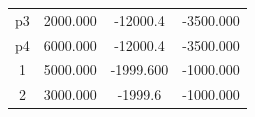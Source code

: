 \begin{table}[h]
\begin{tabular}{cccc}
\multicolumn{1}{c|}{p3} &
\multicolumn{1}{c|}{2000.000} &
\multicolumn{1}{c|}{-12000.4} &
\multicolumn{1}{c}{-3500.000} \\

\multicolumn{1}{c|}{p4} &
\multicolumn{1}{c|}{6000.000} &
\multicolumn{1}{c|}{-12000.4} &
\multicolumn{1}{c}{-3500.000} \\

\multicolumn{1}{c|}{1} &
\multicolumn{1}{c|}{5000.000} &
\multicolumn{1}{c|}{-1999.600} &
\multicolumn{1}{c}{-1000.000} \\

\multicolumn{1}{c|}{2} &
\multicolumn{1}{c|}{3000.000} &
\multicolumn{1}{c|}{-1999.6} &
\multicolumn{1}{c}{-1000.000} \\
\bottomrule
\end{tabular}
\end{table}

